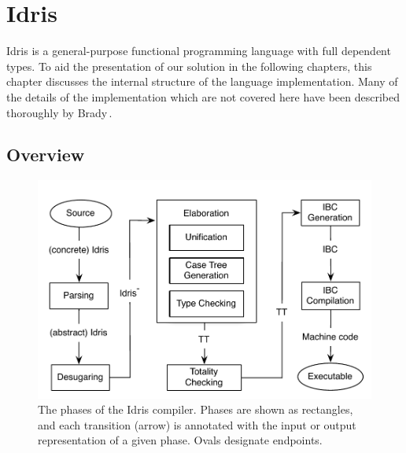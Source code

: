 \chapter{Idris}
Idris is a general-purpose functional programming language with full dependent
types. To aid the presentation of our solution in the following chapters, this
chapter discusses the internal structure of the language implementation. Many of
the details of the implementation which are not covered here have been described
thoroughly by Brady\,\citep{BradyIdrisImpl13}.

\section{Overview}
\begin{figure}
\includegraphics[scale=0.9]{figures/Idris-overview}
\caption{The phases of the Idris compiler. Phases are shown as rectangles, and
  each transition (arrow) is annotated with the input or output representation
  of a given phase. Ovals designate endpoints.}
\label{fig:idris-overview}
\end{figure}
